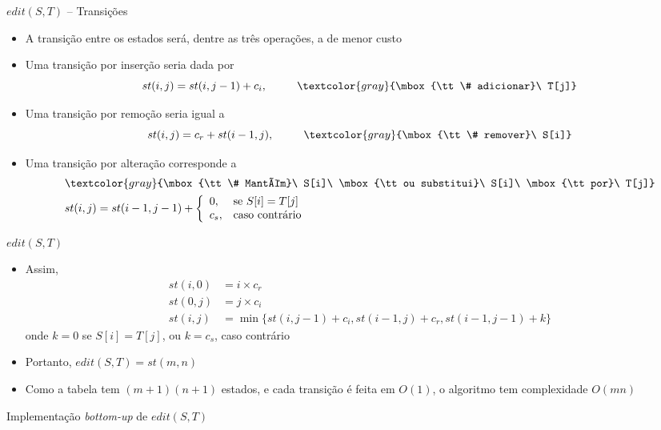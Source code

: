 \begin{frame}[fragile]{$edit(S, T)$ -- Transições}

    \begin{itemize}
        \item A transição entre os estados será, dentre as três operações, a de menor custo

        \item Uma transição por inserção seria dada por
        \[
            st(i, j) = st(i, j - 1) + c_i,\ \ \ \ \ \ \ \ \textcolor{gray}{\mbox{\tt \# adicionar}\ T[j]}
        \]
        \item Uma transição por remoção seria igual a
        \[
            st(i, j) = c_r + st(i - 1, j),\ \ \ \ \ \ \ \ \textcolor{gray}{\mbox{\tt \# remover}\ S[i]}
        \]
        \item Uma transição por alteração corresponde a
        \begin{align*}
            &\textcolor{gray}{\mbox{\tt \# Mantém}\ S[i]\ \mbox{\tt ou substitui}\ S[i]\ \mbox{\tt por}\ T[j]} \\
            &st(i, j) = st(i - 1, j - 1) + \left\lbrace\begin{array}{ll}0, & \mbox{se}\ S[i] = T[j] \\ c_s,& \mbox{caso contrário}\end{array}\right.   
        \end{align*}
    \end{itemize}

\end{frame}

\begin{frame}[fragile]{$edit(S, T)$}

    \begin{itemize}
        \item Assim,
        \begin{align*}
            st(i, 0) &= i \times c_r \\
            st(0, j) &= j \times c_i \\
            st(i, j) &= \min\lbrace st(i, j - 1) + c_i, st(i - 1, j) + c_r, st(i - 1, j - 1) + k \rbrace
        \end{align*}
        onde $k = 0$ se $S[i] = T[j]$, ou $k = c_s$, caso contrário

        \item Portanto, $edit(S, T) = st(m, n)$
        \item Como a tabela tem $(m + 1)(n + 1)$ estados, e cada transição é feita em $O(1)$, o algoritmo tem 
            complexidade $O(mn)$
    \end{itemize}

\end{frame}



\begin{frame}[fragile]{Implementação {\it bottom-up} de $edit(S, T)$}
\end{frame}

